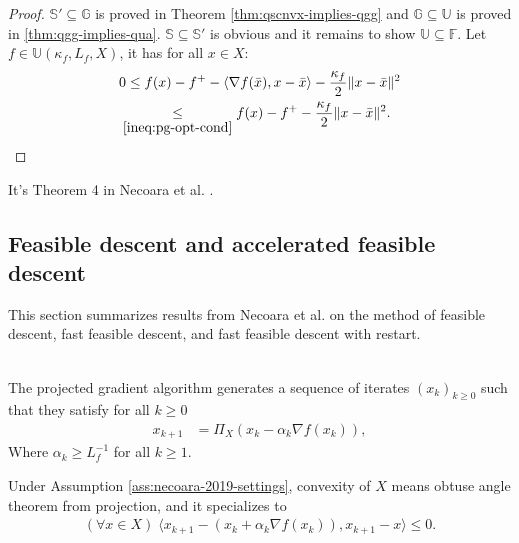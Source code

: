 \documentclass[12pt]{report}
\begin{document}
            \begin{proof}
                $\mathbb S' \subseteq \mathbb G$ is proved in Theorem \ref{thm:qscnvx-implies-qgg} and $\mathbb G \subseteq \mathbb U$ is proved in \ref{thm:qgg-implies-qua}. 
                $\mathbb S\subseteq \mathbb S'$ is obvious and it remains to show $\mathbb U \subseteq \mathbb F$. 
                Let $f\in \mathbb U(\kappa_f, L_f, X)$, it has for all $x \in X$: 
                \begin{align*}
                    0 &\le f(x) - f^+ - \langle \nabla f(\bar x), x - \bar x\rangle - \frac{\kappa_f}{2}\Vert x - \bar x\Vert^2
                    \\
                    &\hspace{-0.5em}\underset{\eqref{ineq:pg-opt-cond}}{\le} 
                    f(x) - f^+ - \frac{\kappa_f}{2}\Vert x - \bar x\Vert^2. 
                \end{align*}
            \end{proof}
            \begin{remark}
                It's Theorem 4 in Necoara et al. \cite{necoara_linear_2019}.
            \end{remark}

       

        \subsection{Feasible descent and accelerated feasible descent}
            This section summarizes results from Necoara et al. on the method of feasible descent, fast feasible descent, and fast feasible descent with restart. 
            \begin{definition}\label{def:projg-alg}\;\\
                The projected gradient algorithm generates a sequence of iterates $(x_k)_{k \ge 0}$ such that they satisfy for all $k \ge 0$
                \begin{align*}
                    x_{k + 1} &= \Pi_X(x_k - \alpha_k \nabla f(x_k)), 
                \end{align*}
                Where $\alpha_k \ge L_f^{-1}$ for all $k \ge 1$. 
            \end{definition}
            Under Assumption \ref{ass:necoara-2019-settings}, convexity of $X$ means obtuse angle theorem from projection, and it specializes to 
            \begin{align}\label{ineq:projg-variational-ineq}
                (\forall x \in X)\; \langle x_{k + 1} - (x_k + \alpha_k \nabla f(x_k)), x_{k + 1} - x\rangle \le 0. 
            \end{align}
\end{document}
